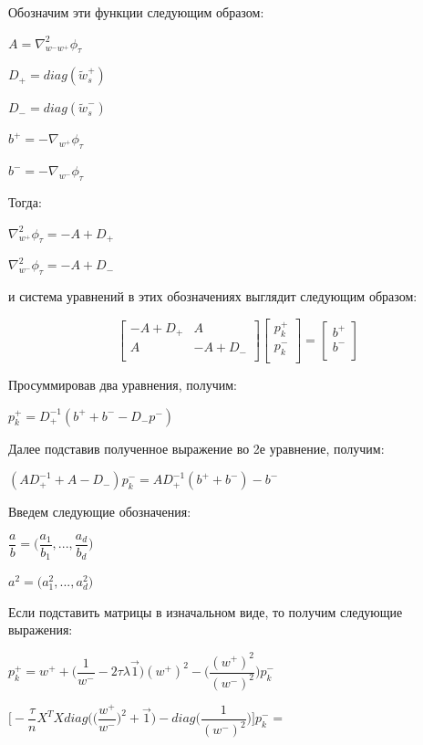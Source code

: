 \documentclass[12pt, a4paper]{article}
\begin{document}
    Обозначим эти функции следующим образом:

    $A = \nabla_{w^-w^+}^2 \phi_\tau$

    $D_+ = diag(\widetilde{w}_s^+)$

    $D_- = diag(\widetilde{w}_s^-)$

    $b^+ = -\nabla_{w^+} \phi_\tau$

    $b^- = -\nabla_{w^-} \phi_\tau$

    Тогда:

    $\nabla_{w^+}^2 \phi_\tau = -A + D_+$

    $\nabla_{w^-}^2 \phi_\tau = -A + D_-$

    и система уравнений в этих обозначениях выглядит следующим образом:

    $$
    \begin{bmatrix}
        -A + D_+ & A \\[0.3em]
        A & -A + D_- \\[0.3em]
    \end{bmatrix}
    \begin{bmatrix}
        p_k^+ \\[0.3em]
        p_k^- \\[0.3em]
    \end{bmatrix}
    =
    \begin{bmatrix}
        b^+ \\[0.3em]
        b^- \\[0.3em]
    \end{bmatrix}
    $$

    Просуммировав два уравнения, получим:

    $p_k^+ = D_+^{-1}(b^+ + b^- - D_-p^-)$

    Далее подставив полученное выражение во 2е уравнение, получим:

    $(AD_+^{-1} + A - D_-)p_k^- = AD_+^{-1}(b^+ + b^-) - b^-$

    Введем следующие обозначения:

    $\dfrac{a}{b} = \Big(\dfrac{a_1}{b_1}, ..., \dfrac{a_d}{b_d}\Big)$

    $a^2 = \Big(a_1^2, ..., a_d^2\Big)$

    Если подставить матрицы в изначальном виде, то получим следующие выражения:

    $p_k^+ = w^+ + \Big(\dfrac{1}{w^-} - 2\tau\lambda\vec{1}\Big) (w^+)^2 - \Big(\dfrac{(w^+)^2}{(w^-)^2}\Big)p_k^-$

    $\Big[-\dfrac{\tau}{n}X^T X diag\Big( \Big(\dfrac{w^+}{w^-}\Big)^2 + \vec{1} \Big) - diag\Big( \dfrac{1}{(w^-)^2} \Big) \Big]p_k^- =$
\end{document}
